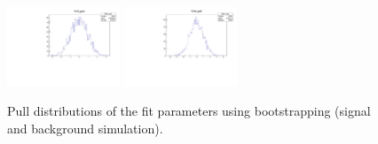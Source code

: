\begin{figure}[tb]
\begin{center}
	\includegraphics[width=0.3\textwidth]{figs/MCwBkgPulls/DG_pull.pdf}
	\includegraphics[width=0.3\textwidth]{figs/MCwBkgPulls/Dm_pull.pdf}
   \end{center}
   \caption{
	Pull distributions of the fit parameters using bootstrapping (signal and background simulation).
   }
   \label{fig:Pulls_MCwBkg}
\end{figure}
\clearpage
